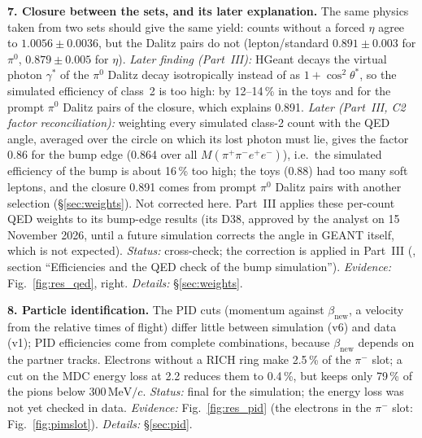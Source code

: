 \documentclass[11pt,a4paper]{article}
\newcommand{\pim}{\ensuremath{\pi^{-}}\xspace}
\newcommand{\piz}{\ensuremath{\pi^{0}}\xspace}
\newcommand{\Mfour}{\ensuremath{M(\pi^{+}\pi^{-}e^{+}e^{-})}\xspace}
\newcommand{\betanew}{\ensuremath{\beta_{\mathrm{new}}}\xspace}
\newcommand{\MeVc}{\ensuremath{\mathrm{MeV}/c}\xspace}
\newcommand{\code}[1]{\texttt{\detokenize{#1}}}
\begin{document}
\textbf{7. Closure between the sets, and its later explanation.} The same physics taken from two sets should give the
same yield: counts without a forced $\eta$ agree to $1.0056\pm0.0036$, but the Dalitz pairs do not (lepton/standard
$0.891\pm0.003$ for \piz, $0.879\pm0.005$ for $\eta$). \emph{Later finding (Part~III):} HGeant decays the virtual photon
$\gamma^*$ of the \piz Dalitz decay isotropically instead of as $1+\cos^2\theta^*$, so the simulated efficiency of
class~2 is too high: by 12--14\,\% in the toys and for the prompt \piz Dalitz pairs of the closure, which explains 0.891.
\emph{Later (Part~III, C2 factor reconciliation):} weighting every simulated class-2 count with the QED angle, averaged
over the circle on which its lost photon must lie, gives the factor 0.86 for the bump edge (0.864 over all \Mfour), i.e.\
the simulated efficiency of the bump is about 16\,\% too high; the toys (0.88) had too many soft leptons, and the closure
0.891 comes from prompt \piz Dalitz pairs with another selection (\S\ref{sec:weights}). Not corrected here. Part~III applies
these per-count QED weights to its bump-edge results (its D38, approved by the analyst on 15 November 2026, until a future
simulation corrects the angle in GEANT itself, which is not expected). \emph{Status:} cross-check; the correction is
applied in Part~III (\code{report_all.pdf}, section ``Efficiencies and the QED check of the bump simulation'').
\emph{Evidence:} Fig.~\ref{fig:res_qed}, right. \emph{Details:} \S\ref{sec:weights}.



\textbf{8. Particle identification.} The PID cuts (momentum against $\betanew$, a velocity from the relative times of
flight) differ little between simulation (v6) and data (v1); PID efficiencies come from complete combinations, because
$\betanew$ depends on the partner tracks. Electrons without a RICH ring make 2.5\,\% of the \pim slot; a cut on the MDC
energy loss at 2.2 reduces them to 0.4\,\%, but keeps only 79\,\% of the pions below 300\,\MeVc. \emph{Status:} final
for the simulation; the energy loss was not yet checked in data. \emph{Evidence:} Fig.~\ref{fig:res_pid} (the electrons
in the \pim slot: Fig.~\ref{fig:pimslot}). \emph{Details:} \S\ref{sec:pid}.
\end{document}

